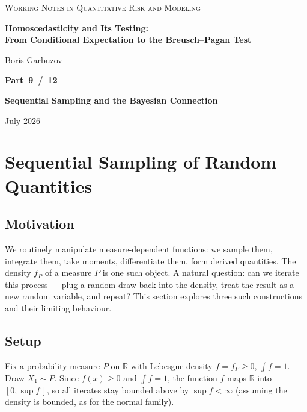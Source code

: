 \documentclass[a4paper,oneside,12pt]{extarticle}
\theoremstyle{plain}
\theoremstyle{definition}
\theoremstyle{remark}
\begin{document}
\begin{titlepage}
\begin{center}

{\footnotesize\scshape\color{gray}
Working Notes in Quantitative Risk and Modeling
}

\vfill

{\LARGE\bfseries Homoscedasticity and Its Testing:\\[4pt]
From Conditional Expectation to the Breusch--Pagan Test}

\vspace{36pt}

{\normalsize Boris Garbuzov}

\vfill

{\Large\bfseries Part~9~/~12}

\vspace{6pt}

{\Large\bfseries Sequential Sampling and the Bayesian Connection}

\vfill

{\small July 2026}

\end{center}
\end{titlepage}

\setcounter{tocdepth}{2}
\tableofcontents
\newpage
\section{Sequential Sampling of Random Quantities}
\label{sec:sequential_sampling}

\subsection{Motivation}

We routinely manipulate measure-dependent functions: we sample them,
integrate them, take moments, differentiate them, form derived
quantities.  The density $f_P$ of a measure $P$ is one such object.
A natural question: can we iterate this process --- plug a random
draw back into the density, treat the result as a new random
variable, and repeat?  This section explores three such
constructions and their limiting behaviour.

\subsection{Setup}

Fix a probability measure $P$ on $\mathbb{R}$ with Lebesgue density
$f = f_P \geq 0$, $\int f = 1$.  Draw $X_1 \sim P$.  Since
$f(x) \geq 0$ and $\int f = 1$, the function $f$ maps $\mathbb{R}$
into $[0, \sup f\,]$, so all iterates stay bounded above by
$\sup f < \infty$ (assuming the density is bounded, as for the
normal family).
\end{document}
